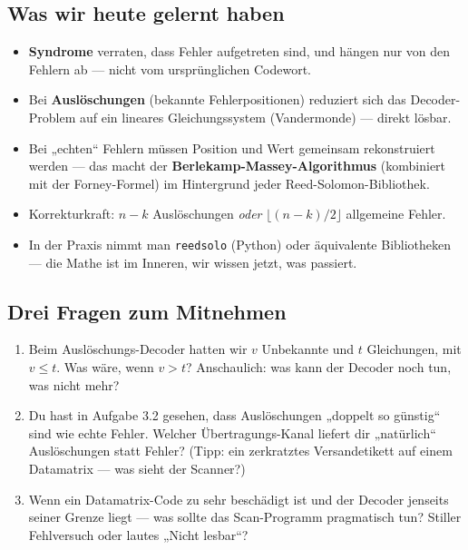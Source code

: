 \subsection*{Was wir heute gelernt haben}

\begin{itemize}
\item \textbf{Syndrome} verraten, dass Fehler aufgetreten sind, und
  hängen nur von den Fehlern ab — nicht vom ursprünglichen Codewort.
\item Bei \textbf{Auslöschungen} (bekannte Fehlerpositionen) reduziert
  sich das Decoder-Problem auf ein lineares Gleichungssystem
  (Vandermonde) — direkt lösbar.
\item Bei „echten“ Fehlern müssen Position und Wert gemeinsam
  rekonstruiert werden — das macht der \textbf{Berlekamp-Massey-Algorithmus}
  (kombiniert mit der Forney-Formel) im Hintergrund jeder
  Reed-Solomon-Bibliothek.
\item Korrekturkraft: $n - k$ Auslöschungen \emph{oder}
  $\lfloor (n-k)/2 \rfloor$ allgemeine Fehler.
\item In der Praxis nimmt man \texttt{reedsolo} (Python) oder
  äquivalente Bibliotheken — die Mathe ist im Inneren, wir
  wissen jetzt, was passiert.
\end{itemize}

\subsection*{Drei Fragen zum Mitnehmen}

\begin{enumerate}
\item Beim Auslöschungs-Decoder hatten wir $v$ Unbekannte und $t$
  Gleichungen, mit $v \le t$. Was wäre, wenn $v > t$? Anschaulich:
  was kann der Decoder noch tun, was nicht mehr?

\item Du hast in Aufgabe 3.2 gesehen, dass Auslöschungen
  „doppelt so günstig“ sind wie echte Fehler. Welcher
  Übertragungs-Kanal liefert dir „natürlich“ Auslöschungen statt
  Fehler? (Tipp: ein zerkratztes Versandetikett auf einem Datamatrix —
  was sieht der Scanner?)

\item Wenn ein Datamatrix-Code zu sehr beschädigt ist und der Decoder
  jenseits seiner Grenze liegt — was sollte das Scan-Programm
  pragmatisch tun? Stiller Fehlversuch oder lautes „Nicht lesbar“?
\end{enumerate}

